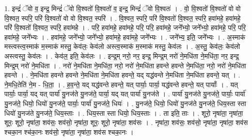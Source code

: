 \documentclass[17pt]{extarticle}
\begin{document}
1. इन्द्रं॑ ॅवो व॒ इन्द्र॒ मिन्द्रं॑ ॅवो वि॒श्वतो॑ वि॒श्वतो॑ व॒ इन्द्र॒ मिन्द्रं॑ ॅवो वि॒श्वतः॑ । . वो॒ वि॒श्वतो॑ वि॒श्वतो॑ वो वो वि॒श्वत॒ स्परि॒ परि॑ वि॒श्वतो॑ वो वो वि॒श्वत॒ स्परि॑ । . वि॒श्वत॒ स्परि॒ परि॑ वि॒श्वतो॑ वि॒श्वत॒ स्परि॒ हवा॑महे॒ हवा॑महे॒ परि॑ वि॒श्वतो॑ वि॒श्वत॒ स्परि॒ हवा॑महे । . परि॒ हवा॑महे॒ हवा॑महे॒ परि॒ परि॒ हवा॑महे॒ जने᳚भ्यो॒ जने᳚भ्यो॒ हवा॑महे॒ परि॒ परि॒ हवा॑महे॒ जने᳚भ्यः । . हवा॑महे॒ जने᳚भ्यो॒ जने᳚भ्यो॒ हवा॑महे॒ हवा॑महे॒ जने᳚भ्यः । . जने᳚भ्य॒ इति॒ जने᳚भ्यः । . अ॒स्माक॑ मस्त्वस्त्व॒स्माक॑ म॒स्माक॑ मस्तु॒ केव॑लः॒ केव॑लो अस्त्व॒स्माक॑ म॒स्माक॑ मस्तु॒ केव॑लः । . अ॒स्तु॒ केव॑लः॒ केव॑लो अस्त्वस्तु॒ केव॑लः । . केव॑ल॒ इति॒ केव॑लः । . इन्द्र॒म् नरो॒ नर॒ इन्द्र॒ मिन्द्र॒म् नरो॑ ने॒मधि॑ता ने॒मधि॑ता॒ नर॒ इन्द्र॒ मिन्द्र॒म् नरो॑ ने॒मधि॑ता । . नरो॑ ने॒मधि॑ता ने॒मधि॑ता॒ नरो॒ नरो॑ ने॒मधि॑ता हवन्ते हवन्ते ने॒मधि॑ता॒ नरो॒ नरो॑ ने॒मधि॑ता हवन्ते । . ने॒मधि॑ता हवन्ते हवन्ते ने॒मधि॑ता ने॒मधि॑ता हवन्ते॒ यद् यद्ध॑वन्ते ने॒मधि॑ता ने॒मधि॑ता हवन्ते॒ यत् । . ने॒मधि॒तेति॑ ने॒म - धि॒ता॒ । . ह॒व॒न्ते॒ यद् यद्ध॑वन्ते हवन्ते॒ यत् पार्याः॒ पार्या॒ यद्ध॑वन्ते हवन्ते॒ यत् पार्याः᳚ । . यत् पार्याः॒ पार्या॒ यद् यत् पार्या॑ यु॒नज॑ते यु॒नज॑ते॒ पार्या॒ यद् यत् पार्या॑ यु॒नज॑ते । . पार्या॑ यु॒नज॑ते यु॒नज॑ते॒ पार्याः॒ पार्या॑ यु॒नज॑ते॒ धियो॒ धियो॑ यु॒नज॑ते॒ पार्याः॒ पार्या॑ यु॒नज॑ते॒ धियः॑ । . यु॒नज॑ते॒ धियो॒ धियो॑ यु॒नज॑ते यु॒नज॑ते॒ धिय॒स्ता स्ता धियो॑ यु॒नज॑ते यु॒नज॑ते॒ धिय॒स्ताः । . धिय॒स्ता स्ता धियो॒ धिय॒स्ताः । . ता इति॒ ताः । . शूरो॒ नृषा॑ता॒ नृषा॑ता॒ शूरः॒ शूरो॒ नृषा॑ता॒ शव॑सः॒ शव॑सो॒ नृषा॑ता॒ शूरः॒ शूरो॒ नृषा॑ता॒ शव॑सः । . नृषा॑ता॒ शव॑सः॒ शव॑सो॒ नृषा॑ता॒ नृषा॑ता॒ शव॑स श्चका॒न श्च॑का॒नः शव॑सो॒ नृषा॑ता॒ नृषा॑ता॒ शव॑स श्चका॒नः । \newline
\end{document}

